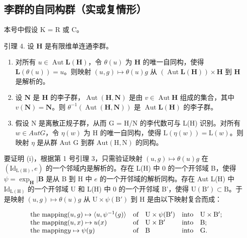 \subsection{李群的自同构群（实或复情形）}

本号中假设 K = R 或 C。

引理 4. 设 \(\mathbf{H}\) 是有限维单连通李群。

\begin{enumerate}
\def\labelenumi{(\roman{enumi})}
\item
  对所有 \(u \in \operatorname{Aut} \mathbf{L}(\mathbf{H})\)，令 \(\theta(u)\) 为 \(\mathbf{H}\) 的唯一自同构，使得 \(\mathbf{L}(\theta(u)) = u\)。则映射 \((u, g) \mapsto \theta(u)g\) 从 \((\operatorname{Aut} \mathbf{L}(\mathbf{H})) \times \mathbf{H}\) 到 \(\mathbf{H}\) 是解析的。
\item
  设 \(\mathbf{N}\) 是 \(\mathbf{H}\) 的李子群，\(\operatorname{Aut}(\mathbf{H},\mathbf{N})\) 是由 \(v\in \operatorname{Aut}\mathbf{H}\) 组成的集合，其中 \(v(\mathbf{N}) = \mathbf{N}\)。则 \(\theta^{-1}(\operatorname {Aut}(\mathbf{H},\mathbf{N}))\) 是 \(\operatorname {Aut}\mathbf{L}(\mathbf{H})\) 的李子群。
\item
  假设 N 是离散正规子群，从而 G = H/N 的李代数可与 L(H) 识别。对所有 \(w \in Aut G\)，令 \(\eta(w)\) 为 H 的唯一自同构，使得 \(\mathrm{L}(\eta(w)) = \mathrm{L}(w)\)。则映射 \(\eta\) 是从群 Aut G 到群 \(\mathrm{Aut}(\mathrm{H}, \mathrm{N})\) 的同构。
\end{enumerate}

要证明 (i)，根据第 1 号引理 3，只需验证映射 \((u,g)\mapsto\theta(u)g\) 在 \((\mathrm{Id}_{\mathrm{L(H)}},e)\) 的一个邻域内是解析的。存在 L(H) 中 0 的一个开邻域 B，使得 \(\psi = \exp_{\mathbf{H}}|\mathbf{B}\) 是从 B 到 H 中 \(e\) 的一个开邻域的解析同构。存在 Aut L(H) 中 \(\mathrm{Id}_{\mathrm{L(H)}}\) 的一个开邻域 U 和 L(H) 中 0 的一个开邻域 B'，使得 \(\mathrm{U(B')} \subset \mathrm{B}\)。于是映射 \((u, g) \mapsto \theta(u)g\) 从 \(\mathrm{U} \times \psi(\mathrm{B'})\) 到 H 是由以下映射复合而成：

\[
\begin{array}{l l l l} \text {the mapping} (u, g) \mapsto \langle u, \psi^ {- 1} (g) \rangle & \text {of} & \mathrm{U} \times \psi (\mathrm{B} ^ {\prime}) & \text {into} \quad \mathrm{U} \times \mathrm{B} ^ {\prime}; \\ \text {the mapping} (u, x) \mapsto u (x) & \text {of} & \mathrm{U} \times \mathrm{B} ^ {\prime} & \text {into} \quad \mathrm{B}; \\ \text {the mapping} y \mapsto \psi (y) & \text {of} & \mathrm{B} & \text {into} \quad \mathrm{G}. \end{array}
\]

